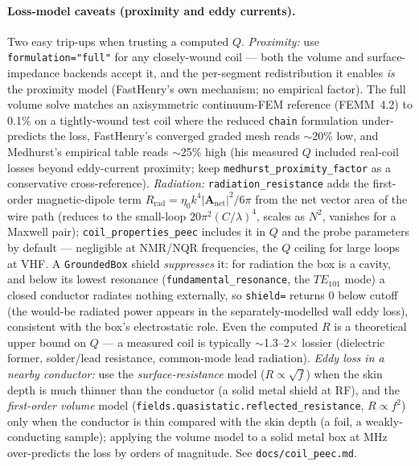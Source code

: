 \documentclass[11pt,oneside]{report}
\newcommand{\code}[1]{\texttt{#1}}
\begin{document}
\paragraph{Loss-model caveats (proximity and eddy currents).} Two easy trip-ups when
trusting a computed \(Q\). \emph{Proximity:} use \code{formulation="full"} for any
closely-wound coil --- both the volume and surface-impedance backends accept it, and the
per-segment redistribution it enables \emph{is} the proximity model (FastHenry's own
mechanism; no empirical factor). The full volume solve matches an axisymmetric
continuum-FEM reference (FEMM~4.2) to 0.1\% on a tightly-wound test coil where the reduced
\code{chain} formulation under-predicts the loss, FastHenry's converged graded mesh reads
\(\sim\)20\% low, and Medhurst's empirical table reads \(\sim\)25\% high (his measured
\(Q\) included real-coil losses beyond eddy-current proximity; keep
\code{medhurst\_proximity\_factor} as a conservative cross-reference). \emph{Radiation:}
\code{radiation\_resistance} adds the first-order magnetic-dipole term
\(R_{\text{rad}}=\eta_0 k^4|\mathbf A_{\text{net}}|^2/6\pi\) from the net vector area of
the wire path (reduces to the small-loop \(20\pi^2(C/\lambda)^4\), scales as \(N^2\),
vanishes for a Maxwell pair); \code{coil\_properties\_peec} includes it in \(Q\) and the
probe parameters by default --- negligible at NMR/NQR frequencies, the \(Q\) ceiling for
large loops at VHF. A \code{GroundedBox} shield \emph{suppresses} it: for radiation the box
is a cavity, and below its lowest resonance (\code{fundamental\_resonance}, the \(TE_{101}\)
mode) a closed conductor radiates nothing externally, so \code{shield=} returns \(0\) below
cutoff (the would-be radiated power appears in the separately-modelled wall eddy loss),
consistent with the box's electrostatic role. Even the computed \(R\) is a theoretical upper
bound on \(Q\) --- a measured coil is typically \(\sim\)1.3--2\(\times\) lossier (dielectric
former, solder/lead resistance, common-mode lead radiation). \emph{Eddy loss in a nearby
conductor:} use the \emph{surface-resistance} model
(\(R\propto\sqrt f\)) when the skin depth is much thinner than the conductor (a solid metal
shield at RF), and the \emph{first-order volume} model
(\code{fields.quasistatic.reflected\_resistance}, \(R\propto f^2\)) only when the conductor
is thin compared with the skin depth (a foil, a weakly-conducting sample); applying the
volume model to a solid metal box at MHz over-predicts the loss by orders of magnitude. See
\code{docs/coil\_peec.md}.
\end{document}

